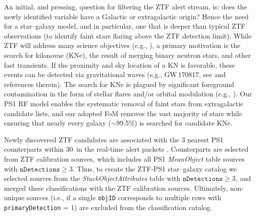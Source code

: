 \documentclass[twocolumn]{aastex62}
\begin{document}
\begin{CJK*}{UTF8}{gbsn}
An initial, and pressing, question for filtering the ZTF alert stream, is:
does the newly identified variable have a Galactic or extragalactic origin?
Hence the need for a star--galaxy model, and in particular, one that is
deeper than typical ZTF observations (to identify faint stars flaring above
the ZTF detection limit). While ZTF will address many science objectives
(e.g., \citealt{Graham:18:ZTF}), a primary motivation is the search for
kilonovae (KNe), the result of merging binary neutron stars, and other fast
transients. If the proximity and sky location of a KN is favorable, these
events can be detected via gravitational waves (e.g., GW\,170817, see
\citealt{Abbott17} and references therein). The search for KNe is plagued by
significant foreground contamination in the form of stellar flares and/or
orbital modulation (e.g., \citealt{Kulkarni06, Berger12, Kasliwal16}). Our
PS1 RF model enables the systematic removal of faint stars from
extragalactic candidate lists, and our adopted FoM removes the vast majority
of stars while ensuring that nearly every galaxy ($\sim$99.5\%) is searched
for candidate KNe.

Newly discovered ZTF candidates are associated with the 3 nearest PS1
counterparts within 30\arcsec\ in the real-time alert packets
\citep{Masci:18:ZTF}. Counterparts are selected from ZTF calibration
sources, which includes all PS1 \textit{MeanObject} table sources with
$\mathtt{nDetections} \ge 3$. Thus, to create the ZTF-PS1 star--galaxy
catalog we selected sources from the \textit{StackObjectAttributes} table
with $\mathtt{nDetections} \ge 3$, and merged these classifications with the
ZTF calibration sources. Ultimately, non-unique sources (i.e., if a single
\texttt{objID} corresponds to multiple rows with \texttt{primaryDetection} =
1) are excluded from the classification catalog.


\end{CJK*}
\end{document}
